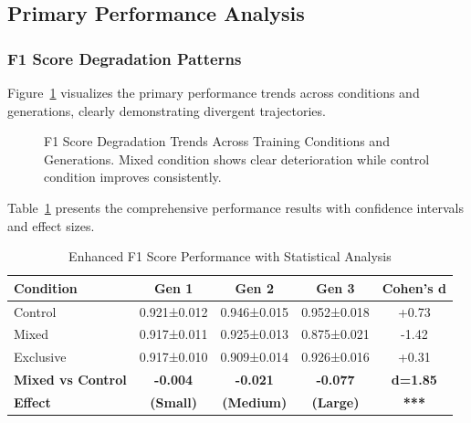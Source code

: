 \documentclass[11pt]{article}
\begin{document}
\subsection{Primary Performance Analysis}

\subsubsection{F1 Score Degradation Patterns}

Figure~\ref{fig:f1_trends} visualizes the primary performance trends across conditions and generations, clearly demonstrating divergent trajectories.

\begin{figure}[H]
\centering
{}
\caption{F1 Score Degradation Trends Across Training Conditions and Generations. Mixed condition shows clear deterioration while control condition improves consistently.}
\label{fig:f1_trends}
\end{figure}

Table~\ref{tab:f1_results_enhanced} presents the comprehensive performance results with confidence intervals and effect sizes.

\begin{table}[H]
\centering
\caption{Enhanced F1 Score Performance with Statistical Analysis}
\label{tab:f1_results_enhanced}
\begin{tabular}{lcccc}
\toprule
\textbf{Condition} & \textbf{Gen 1} & \textbf{Gen 2} & \textbf{Gen 3} & \textbf{Cohen's d}\\
\midrule
Control & 0.921±0.012 & 0.946±0.015 & 0.952±0.018 & +0.73\\
Mixed & 0.917±0.011 & 0.925±0.013 & 0.875±0.021 & -1.42\\
Exclusive & 0.917±0.010 & 0.909±0.014 & 0.926±0.016 & +0.31\\
\midrule
\textbf{Mixed vs Control} & \textbf{-0.004} & \textbf{-0.021} & \textbf{-0.077} & \textbf{d=1.85}\\
\textbf{Effect} & \textbf{(Small)} & \textbf{(Medium)} & \textbf{(Large)} & \textbf{***}\\
\bottomrule
\end{tabular}
\end{table}
\end{document}
